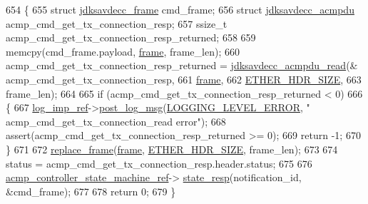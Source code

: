 \begin{DoxyCode}
654 \{
655     \textcolor{keyword}{struct }\hyperlink{structjdksavdecc__frame}{jdksavdecc\_frame} cmd\_frame;
656     \textcolor{keyword}{struct }\hyperlink{structjdksavdecc__acmpdu}{jdksavdecc\_acmpdu} acmp\_cmd\_get\_tx\_connection\_resp;
657     ssize\_t acmp\_cmd\_get\_tx\_connection\_resp\_returned;
658 
659     memcpy(cmd\_frame.payload, \hyperlink{gst__avb__playbin_8c_ac8e710e0b5e994c0545d75d69868c6f0}{frame}, frame\_len);
660     acmp\_cmd\_get\_tx\_connection\_resp\_returned = \hyperlink{group__acmpdu_gaf49dbf727e31865dd891330cbdeeabc2}{jdksavdecc\_acmpdu\_read}(&
      acmp\_cmd\_get\_tx\_connection\_resp,
661                                                                       \hyperlink{gst__avb__playbin_8c_ac8e710e0b5e994c0545d75d69868c6f0}{frame},
662                                                                       
      \hyperlink{namespaceavdecc__lib_a6c827b1a0d973e18119c5e3da518e65ca9512ad9b34302ba7048d88197e0a2dc0}{ETHER\_HDR\_SIZE},
663                                                                       frame\_len);
664 
665     \textcolor{keywordflow}{if} (acmp\_cmd\_get\_tx\_connection\_resp\_returned < 0)
666     \{
667         \hyperlink{namespaceavdecc__lib_acbe3e2a96ae6524943ca532c87a28529}{log\_imp\_ref}->\hyperlink{classavdecc__lib_1_1log_a68139a6297697e4ccebf36ccfd02e44a}{post\_log\_msg}(\hyperlink{namespaceavdecc__lib_a501055c431e6872ef46f252ad13f85cdaf2c4481208273451a6f5c7bb9770ec8a}{LOGGING\_LEVEL\_ERROR}, \textcolor{stringliteral}{"
      acmp\_cmd\_get\_tx\_connection\_read error"});
668         assert(acmp\_cmd\_get\_tx\_connection\_resp\_returned >= 0);
669         \textcolor{keywordflow}{return} -1;
670     \}
671 
672     \hyperlink{classavdecc__lib_1_1descriptor__base__imp_a482fe95208e9e14885e28e73e7be2c49}{replace\_frame}(\hyperlink{gst__avb__playbin_8c_ac8e710e0b5e994c0545d75d69868c6f0}{frame}, \hyperlink{namespaceavdecc__lib_a6c827b1a0d973e18119c5e3da518e65ca9512ad9b34302ba7048d88197e0a2dc0}{ETHER\_HDR\_SIZE}, frame\_len);
673 
674     status = acmp\_cmd\_get\_tx\_connection\_resp.header.status;
675 
676     \hyperlink{namespaceavdecc__lib_a693c2049de1d4ec860a92126b846ac21}{acmp\_controller\_state\_machine\_ref}->
      \hyperlink{classavdecc__lib_1_1acmp__controller__state__machine_affdd2e72c0e7a518e4b8993e23750aa9}{state\_resp}(notification\_id, &cmd\_frame);
677 
678     \textcolor{keywordflow}{return} 0;
679 \}
\end{DoxyCode}



